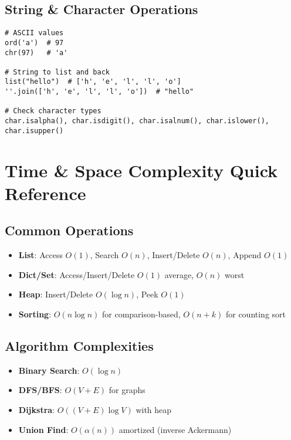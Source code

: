 \subsection{String \& Character Operations}
\begin{verbatim}
# ASCII values
ord('a')  # 97
chr(97)   # 'a'

# String to list and back
list("hello")  # ['h', 'e', 'l', 'l', 'o']
''.join(['h', 'e', 'l', 'l', 'o'])  # "hello"

# Check character types
char.isalpha(), char.isdigit(), char.isalnum(), char.islower(), char.isupper()
\end{verbatim}

\section{Time \& Space Complexity Quick Reference}

\subsection{Common Operations}
\begin{itemize}
    \item \textbf{List}: Access $O(1)$, Search $O(n)$, Insert/Delete $O(n)$, Append $O(1)$
    \item \textbf{Dict/Set}: Access/Insert/Delete $O(1)$ average, $O(n)$ worst
    \item \textbf{Heap}: Insert/Delete $O(\log n)$, Peek $O(1)$
    \item \textbf{Sorting}: $O(n \log n)$ for comparison-based, $O(n+k)$ for counting sort
\end{itemize}

\subsection{Algorithm Complexities}
\begin{itemize}
    \item \textbf{Binary Search}: $O(\log n)$
    \item \textbf{DFS/BFS}: $O(V + E)$ for graphs
    \item \textbf{Dijkstra}: $O((V + E) \log V)$ with heap
    \item \textbf{Union Find}: $O(\alpha(n))$ amortized (inverse Ackermann)
\end{itemize}

